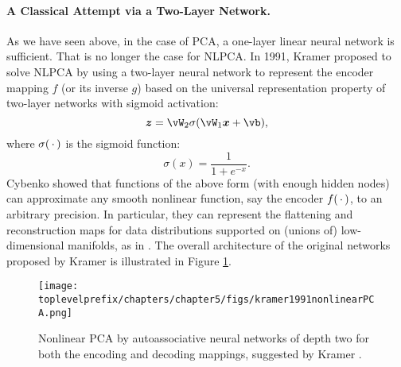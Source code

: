 \documentclass[../../book-main.tex]{subfiles}
\begin{document}
\paragraph{A Classical Attempt via a Two-Layer Network.} As we have
seen above, in the case of PCA, a one-layer linear neural
network is sufficient. That is no longer the case for NLPCA. In 1991, Kramer
\cite{Kramer1991NonlinearPC}  proposed to solve NLPCA by using a two-layer
neural network to represent the encoder mapping $f$ (or its inverse $g$) based
on the universal representation property of two-layer networks with sigmoid
activation:
\begin{equation}
  \z = \vW_2 \sigma(\vW_1\x +\vb),
\end{equation}
where $\sigma(\,\cdot\,)$ is the sigmoid function:
\begin{equation}
  \sigma(x) = \frac{1}{1+ e^{-x}}.
\end{equation}
Cybenko \cite{Cybenko1989ApproximationBS} showed that functions of
the above form (with enough hidden nodes) can approximate any smooth
nonlinear function, say the encoder $f(\,\cdot\,)$, to an arbitrary
precision. In particular, they can represent the flattening and reconstruction
maps for data distributions supported on (unions of) low-dimensional manifolds,
as in . The overall architecture of the
original networks proposed by Kramer is illustrated in Figure \ref{fig:NLPCA}.
\begin{figure}[tb]
  \centering
  \texttt{[image: \\toplevelprefix/chapters/chapter5/figs/kramer1991nonlinearPCA.png]}
  \caption{Nonlinear PCA by  autoassociative neural networks of depth
    two for both the encoding and decoding mappings, suggested by
  Kramer \cite{Kramer1991NonlinearPC}.}
  \label{fig:NLPCA}
\end{figure}
\end{document}
